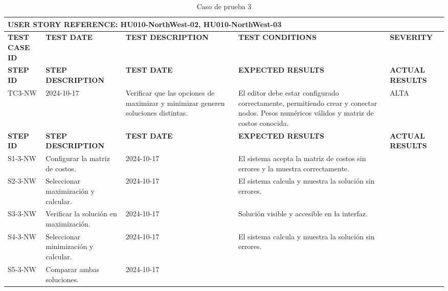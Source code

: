 \documentclass[stu, 12pt, letterpaper, donotrepeattitle, floatsintext, natbib]{apa7}
\begin{document}
\begin{longtable}{|p{2cm}|p{3cm}|p{3cm}|p{3cm}|p{3cm}|}
    \caption{Caso de prueba 3} \label{tab:casos_prueba3} \\
    \hline
    \multicolumn{5}{|l|}{\textbf{USER STORY REFERENCE: HU010-NorthWest-02, HU010-NorthWest-03}} \\ \hline
    \textbf{TEST CASE ID} & \textbf{TEST DATE} & \textbf{TEST DESCRIPTION} & \textbf{TEST CONDITIONS} & \textbf{SEVERITY } \\ \hline
    \endfirsthead
    \hline
    \textbf{STEP ID} & \textbf{STEP DESCRIPTION} & \textbf{TEST DATE} & \textbf{EXPECTED RESULTS} & \textbf{ACTUAL RESULTS} \\ \hline
    \endhead
    TC3-NW & 2024-10-17 & Verificar que las opciones de maximizar y minimizar generen soluciones distintas. & El editor debe estar configurado correctamente, permitiendo crear y conectar nodos. Pesos numéricos válidos y matriz de costos conocida. & ALTA \\ \hline
    \textbf{STEP ID} & \textbf{STEP DESCRIPTION} & \textbf{TEST DATE} & \textbf{EXPECTED RESULTS} & \textbf{ACTUAL RESULTS} \\ \hline
    S1-3-NW & Configurar la matriz de costos. & 2024-10-17 & El sistema acepta la matriz de costos sin errores y la muestra correctamente. & \\ \hline
    S2-3-NW & Seleccionar maximización y calcular. & 2024-10-17 & El sistema calcula y muestra la solución sin errores. &  \\ \hline
    S3-3-NW & Verificar la solución en maximización. & 2024-10-17 & Solución visible y accesible en la interfaz. & \\ \hline
    S4-3-NW & Seleccionar minimización y calcular. & 2024-10-17 & El sistema calcula y muestra la solución sin errores. & \\ \hline
    S5-3-NW & Comparar ambas soluciones. & 2024-10-17 & \\ \hline
\end{longtable}
\end{document}
